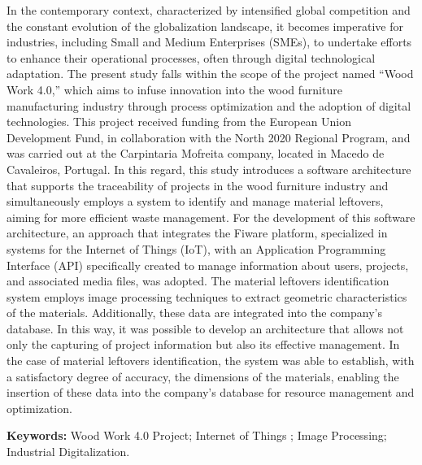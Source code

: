 

In the contemporary context, characterized by intensified global competition and the constant evolution of the globalization landscape, it becomes imperative for industries, including Small and Medium Enterprises (SMEs), to undertake efforts to enhance their operational processes, often through digital technological adaptation. The present study falls within the scope of the project named “Wood Work 4.0,” which aims to infuse innovation into the wood furniture manufacturing industry through process optimization and the adoption of digital technologies. This project received funding from the European Union Development Fund, in collaboration with the North 2020 Regional Program, and was carried out at the Carpintaria Mofreita company, located in Macedo de Cavaleiros, Portugal. In this regard, this study introduces a software architecture that supports the traceability of projects in the wood furniture industry and simultaneously employs a system to identify and manage material leftovers, aiming for more efficient waste management. For the development of this software architecture, an approach that integrates the Fiware platform, specialized in systems for the Internet of Things (IoT), with an Application Programming Interface (API) specifically created to manage information about users, projects, and associated media files, was adopted. The material leftovers identification system employs image processing techniques to extract geometric characteristics of the materials. Additionally, these data are integrated into the company’s database. In this way, it was possible to develop an architecture that allows not only the capturing of project information but also its effective management. In the case of material leftovers identification, the system was able to establish, with a satisfactory degree of accuracy, the dimensions of the materials, enabling the insertion of these data into the company's database for resource management and optimization.

\bigskip

\noindent \textbf{Keywords:} Wood Work 4.0 Project; Internet of Things ; Image Processing; Industrial Digitalization.

